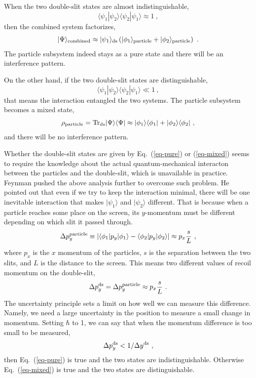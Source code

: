 \documentclass[aps,showpacs,onecolumn,floats,prd,superscriptaddress,nofootinbib]{revtex4-1}
\begin{document}
When the two double-slit states are almost indistinguishable,
\begin{equation}
\langle\psi_1|\psi_2\rangle\langle\psi_2|\psi_1\rangle \approx 1~,
\label{eq-pure}
\end{equation}
then the combined system factorizes,
\begin{equation}
|\Psi\rangle_{\rm combined} \approx |\psi_1\rangle_{\rm ds}
\left(|\phi_1\rangle_{\rm particle} + |\phi_2\rangle_{\rm particle}\right) ~.
\end{equation}
The particle subsystem indeed stays as a pure state and there will be an interference pattern.

On the other hand, if the two double-slit states are distinguishable,
\begin{equation}
\langle\psi_1|\psi_2\rangle\langle\psi_2|\psi_1\rangle \ll 1~,
\label{eq-mixed}
\end{equation}
that means the interaction entangled the two systems. The particle subsystem becomes a mixed state,
\begin{equation}
\rho_{\rm particle} = {\rm Tr}_{\rm ds}|\Psi\rangle\langle\Psi| \approx
|\phi_1\rangle\langle\phi_1| + |\phi_2\rangle\langle\phi_2|~,
\end{equation}
and there will be no interference pattern.

Whether the double-slit states are given by Eq.~(\ref{eq-pure}) or (\ref{eq-mixed}) seems to require the knowledge about the actual quantum-mechanical interacton between the particles and the double-slit, which is unavailable in practice.
Feynman pushed the above analysis further to overcome such problem.
He pointed out that even if we try to keep the interaction minimal, there will be one inevitable interaction that makes $|\psi_1\rangle$ and $|\psi_2\rangle$ different.
That is because when a particle reaches some place on the screen, its $y$-momentum must be different depending on which slit it passed through.
\begin{equation}
\Delta p_y^{\rm particle} \equiv 
|\langle\phi_1|p_y|\phi_1\rangle - \langle\phi_2|p_y|\phi_2\rangle| 
\approx p_x \frac{s}{L}~,
\end{equation}
where $p_x$ is the $x$ momentum of the particles, $s$ is the separation between the two slits, and $L$ is the distance to the screen. 
This means two different values of recoil momentum on the double-slit,
\begin{equation}
\Delta p_y^{\rm ds} = \Delta p_y^{\rm particle} \approx p_x \frac{s}{L}~.
\label{eq-dpds}
\end{equation}
The uncertainty principle sets a limit on how well we can measure this difference. Namely, we need a large uncertainty in the position to measure a small change in momentum. Setting $\hbar$ to 1, we can say that when the momentum difference is too small to be measured,
\begin{equation}
\Delta p_y^{\rm ds} < 1/\Delta y^{\rm ds}~,
\label{eq-standard}
\end{equation} 
then Eq.~(\ref{eq-pure}) is true and the two states are indistinguishable. 
Otherwise Eq.~(\ref{eq-mixed}) is true and the two states are distinguishable.
\end{document}
